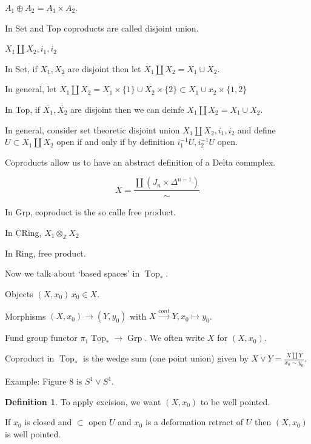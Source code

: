 \documentclass{article}
\theoremstyle{definition}
\newtheorem*{definition}{Definition}
\begin{document}
    \(A_1 \oplus A_2 = A_1 \times A_2\).

    In Set and Top coproducts are called disjoint union.

    \(X_1 \coprod X_2, i_1, i_2\)

    In Set, if \(X_1, X_2\) are disjoint then let \(X_1 \coprod X_2 = X_1 \cup X_2\).


    In general, let \(X_1 \coprod X_2 = X_1 \times \{ 1 \} \cup X_2 \times \{ 2 \} \subset X_1 \cup x_2 \times \{ 1,2 \} \)

    In Top, if \(\overline{X_1}, \overline{X_2}\) are disjoint then we can deinfe \(X_1 \coprod X_2 = X_1\cup X_2\).  

    In general, consider set theoretic disjoint union \(X_1 \coprod X_2, i_1, i_2\) and define \(U \subset X_1 \coprod X_2\) open if and only if by definition \(i_1 ^{-1} U, i_2 ^{-1} U\) open.

    Coproducts allow us to have an abstract definition of a Delta commplex.

    \[
        X = \frac{\coprod (J_n \times \Delta^{n-1}) }{\sim}
    \]

    In Grp, coproduct is the so calle free product.

    In CRing, \(X_1 \otimes_{\mathbb{Z}} X_2\)

    In Ring, free product.

    Now we talk about `based spaces' in \(\operatorname{Top}_{\ast}\).

    Objects \((X,x_0)\, x_0\in X\).

    Morphisms \((X,x_0) \to (Y,y_0)\) with \(X \xrightarrow{cont} Y, x_0 \mapsto y_0\).

    Fund group functor \(\pi_1 \operatorname{Top}_{\ast} \to \operatorname{Grp}\). We often write \(X\) for \((X,x_0)\).

    Coproduct in \(\operatorname{Top}_{\ast}\) is the wedge sum (one point union) given by \(X \vee Y = \frac{X \coprod Y}{x_0 \sim y_0}\).

    Example: Figure 8 is \(S^1 \vee S^1\).

    \begin{definition}
        To apply excision, we want \((X,x_0)\) to be well pointed.

        If \(x_0\) is closed and \(\subset\) open \(U\) and \(x_0\) is a deformation retract of \(U\) then \((X,x_0)\) is well pointed.
    \end{definition}
\end{document}
